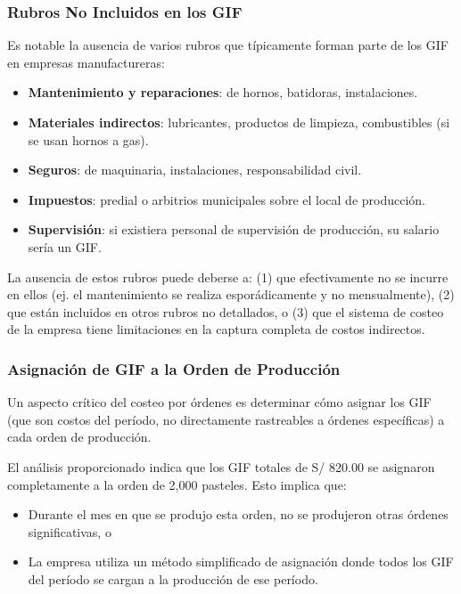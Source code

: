 \documentclass[
  stu,
  floatsintext,
  longtable,
  a4paper,
  nolmodern,
  notxfonts,
  notimes,
  12pt,
  colorlinks=true,linkcolor=blue,citecolor=blue,urlcolor=blue]{apa7}
\providecommand{\tightlist}{%
  \setlength{\itemsep}{0pt}\setlength{\parskip}{0pt}}
\begin{document}
\subsubsection{Rubros No Incluidos en los
GIF}\label{rubros-no-incluidos-en-los-gif}

Es notable la ausencia de varios rubros que típicamente forman parte de
los GIF en empresas manufactureras:

\begin{itemize}
\tightlist
\item
  \textbf{Mantenimiento y reparaciones}: de hornos, batidoras,
  instalaciones.
\item
  \textbf{Materiales indirectos}: lubricantes, productos de limpieza,
  combustibles (si se usan hornos a gas).
\item
  \textbf{Seguros}: de maquinaria, instalaciones, responsabilidad civil.
\item
  \textbf{Impuestos}: predial o arbitrios municipales sobre el local de
  producción.
\item
  \textbf{Supervisión}: si existiera personal de supervisión de
  producción, su salario sería un GIF.
\end{itemize}

La ausencia de estos rubros puede deberse a: (1) que efectivamente no se
incurre en ellos (ej. el mantenimiento se realiza esporádicamente y no
mensualmente), (2) que están incluidos en otros rubros no detallados, o
(3) que el sistema de costeo de la empresa tiene limitaciones en la
captura completa de costos indirectos.

\subsubsection{Asignación de GIF a la Orden de
Producción}\label{asignaciuxf3n-de-gif-a-la-orden-de-producciuxf3n}

Un aspecto crítico del costeo por órdenes es determinar cómo asignar los
GIF (que son costos del período, no directamente rastreables a órdenes
específicas) a cada orden de producción.

El análisis proporcionado indica que los GIF totales de S/ 820.00 se
asignaron completamente a la orden de 2,000 pasteles. Esto implica que:

\begin{itemize}
\tightlist
\item
  Durante el mes en que se produjo esta orden, no se produjeron otras
  órdenes significativas, o
\item
  La empresa utiliza un método simplificado de asignación donde todos
  los GIF del período se cargan a la producción de ese período.
\end{itemize}
\end{document}
